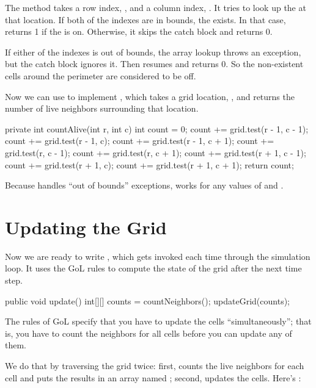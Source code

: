 The  method takes a row index, , and a column index, .
It tries to look up the  at that location.
If both of the indexes are in bounds, the  exists.
In that case,  returns 1 if the  is on.
Otherwise, it skips the catch block and returns 0.

If either of the indexes is out of bounds, the array lookup throws an exception, but the catch block ignores it.
Then  resumes and returns 0.
So the non-existent cells around the perimeter are considered to be off.

Now we can use  to implement , which takes a grid location, , and returns the number of live neighbors surrounding that location.

\begin{code}
private int countAlive(int r, int c) {
    int count = 0;
    count += grid.test(r - 1, c - 1);
    count += grid.test(r - 1, c);
    count += grid.test(r - 1, c + 1);
    count += grid.test(r, c - 1);
    count += grid.test(r, c + 1);
    count += grid.test(r + 1, c - 1);
    count += grid.test(r + 1, c);
    count += grid.test(r + 1, c + 1);
    return count;
}
\end{code}

Because  handles ``out of bounds'' exceptions,  works for any values of  and .


\section{Updating the Grid}
\label{sec:update}

Now we are ready to write , which gets invoked each time through the simulation loop.
It uses the GoL rules to compute the state of the grid after the next time step.

\begin{code}
public void update() {
    int[][] counts = countNeighbors();
    updateGrid(counts);
}
\end{code}

The rules of GoL specify that you have to update the cells ``simultaneously''; that is, you have to count the neighbors for all cells before you can update any of them.

We do that by traversing the grid twice: first,  counts the live neighbors for each cell and puts the results in an array named ; second,  updates the cells.
Here's :

